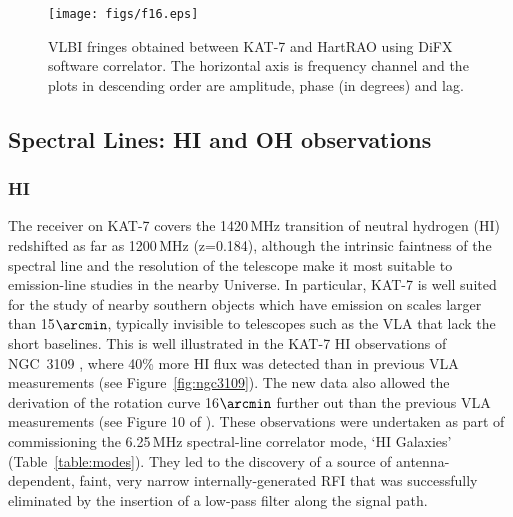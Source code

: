 \begin{figure}
\texttt{[image: figs/f16.eps]} 
\caption{VLBI fringes obtained between KAT-7 and HartRAO using DiFX
  software correlator. The horizontal axis is frequency channel and
  the plots in descending order are amplitude, phase (in degrees) and
  lag.}
\label{fig:vlbifringe}
\end{figure}



\subsection{Spectral Lines: HI and OH observations}

\subsubsection{HI}

\noindent
The receiver on KAT-7 covers the 1420\,MHz transition of neutral
hydrogen (HI) redshifted as far as 1200\,MHz (z=0.184),
although the intrinsic faintness of the
spectral line and the resolution of the telescope make it most
suitable to emission-line studies in the nearby Universe. In
particular, KAT-7 is well suited for the study of nearby southern
objects which have emission on scales larger than 15$\arcmin$,
typically invisible to telescopes such as the VLA that lack the short
baselines. This is well illustrated in the KAT-7 HI observations of
NGC~3109 \citep{Carignan}, where 40\% more HI flux was detected
than in previous VLA measurements (see Figure~\ref{fig:ngc3109}). The
new data also allowed the derivation of the rotation curve 16$\arcmin$
further out than the previous VLA measurements (see Figure 10 of
\citealt{Carignan}). These observations were undertaken as part of
commissioning the 6.25\,MHz spectral-line correlator mode, `HI 
Galaxies' (Table~\ref{table:modes}). They led to the
discovery of a source of antenna-dependent, faint, very narrow
internally-generated RFI that was successfully eliminated by the
insertion of a low-pass filter along the signal path.

